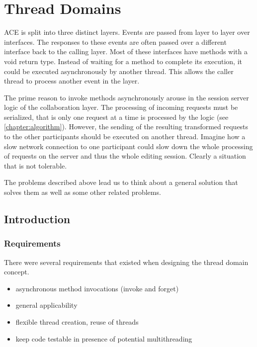 \chapter{Thread Domains}
\label{chapter:threaddomains}

ACE is split into three distinct layers. Events are passed from layer to
layer over interfaces. The responses to these events are often passed over
a different interface back to the calling layer. Most of these interfaces
have methods with a void return type. Instead of waiting for a method
to complete its execution, it could be executed asynchronously by
another thread. This allows the caller thread to process another event
in the layer.

The prime reason to invoke methods asynchronously arouse in the session server
logic of the collaboration layer. The processing of incoming requests
must be serialized, that is only one request at a time is processed by
the logic (see \ref{chapter:algorithm}). However, the sending of the
resulting transformed requests to the other participants should be executed
on another thread. Imagine how a slow network connection to one participant
could slow down the whole processing of requests on the server and thus
the whole editing session. Clearly a situation that is not tolerable.

The problems described above lead us to think about a general solution that 
solves them as well as some other related problems.



\section{Introduction}

\subsection{Requirements}
There were several requirements that existed when designing the thread
domain concept.

\begin{itemize}
 \item asynchronous method invocations (invoke and forget)
 \item general applicability
 \item flexible thread creation, reuse of threads
 \item keep code testable in presence of potential multithreading
\end{itemize}

